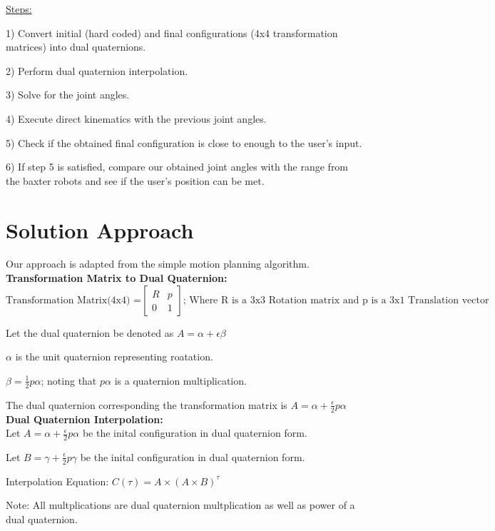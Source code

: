 \documentclass[11pt]{article}
\begin{document}
\underline{Steps:}

1) Convert initial (hard coded) and final configurations (4x4 transformation matrices) into dual quaternions.

2) Perform dual quaternion interpolation.

3) Solve for the joint angles.

4) Execute direct kinematics with the previous joint angles.

5) Check if the obtained final configuration is close to enough to the user’s input.

6) If step 5 is satisfied, compare our obtained joint angles with the range from the baxter robots and see if the user’s position can be met.

\section{Solution Approach}

Our approach is adapted from the simple motion planning algorithm.
\\

{\bf Transformation Matrix to Dual Quaternion:}
$$
\text{Transformation Matrix(4x4) =} \left[
\begin{array}{ccc}
R&p\\
0&1
\end{array}
\right]  \text{; Where R is a 3x3 Rotation matrix and p is a 3x1 Translation vector}
$$

Let the dual quaternion be denoted as $A=\alpha+\epsilon\beta$

$\alpha$ is the unit quaternion representing roatation.

$\beta = \frac{1}{2}p\alpha$; noting that $p\alpha$ is a quaternion multiplication.

The dual quaternion corresponding the transformation matrix is $A=\alpha+\frac{\epsilon}{2}p\alpha$
\\

{\bf Dual Quaternion Interpolation:}
\\

Let  $A=\alpha+\frac{\epsilon}{2}p\alpha$ be the inital configuration in dual quaternion form.

Let  $B=\gamma+\frac{\epsilon}{2}p\gamma$ be the inital configuration in dual quaternion form.

Interpolation Equation:
$C(\tau)= A \times (A \times B)^\tau $		

Note: All multplications are dual quaternion multplication as well as power of a dual quaternion.
\\ 
\end{document}
